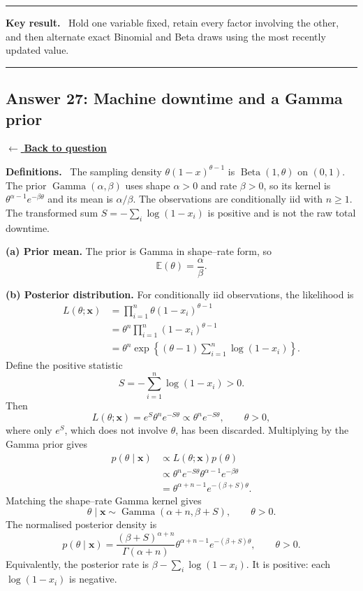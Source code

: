 \documentclass[11pt,a4paper]{article}
\newcommand{\xvec}{\boldsymbol{x}}
\newcommand{\E}{\mathbb{E}}
\newcommand{\answernav}[1]{%
  \label{answer:#1}%
  \noindent\hyperref[question:#1]{$\leftarrow$ \textbf{Back to question}}%
  \par\smallskip}
\newcommand{\studyheading}[1]{%
  \par\medskip\noindent\textcolor{statblue}{\textbf{#1.}}\ }
\newenvironment{keyresult}
  {\begin{center}\begin{minipage}{0.92\linewidth}\color{statblue}%
   \hrule\vspace{6pt}\textbf{Key result.}\ }
  {\vspace{6pt}\hrule\end{minipage}\end{center}}
\begin{document}
\begin{keyresult}
Hold one variable fixed, retain every factor involving the other, and then
alternate exact Binomial and Beta draws using the most recently updated value.
\end{keyresult}

\clearpage

\subsection{Answer 27: Machine downtime and a Gamma prior}
\answernav{27}

\studyheading{Definitions}
The sampling density $\theta(1-x)^{\theta-1}$ is $\operatorname{Beta}(1,\theta)$ on $(0,1)$.
The prior $\operatorname{Gamma}(\alpha,\beta)$ uses shape $\alpha>0$ and rate $\beta>0$, so its kernel is $\theta^{\alpha-1}e^{-\beta\theta}$ and its mean is $\alpha/\beta$.
The observations are conditionally iid with $n\ge1$.
The transformed sum $S=-\sum_i\log(1-x_i)$ is positive and is not the raw total downtime.

\textbf{(a) Prior mean.}
The prior is Gamma in shape--rate form, so
\[
\boxed{\E(\theta)=\frac{\alpha}{\beta}.}
\]

\textbf{(b) Posterior distribution.}
For conditionally iid observations, the likelihood is
\[
\begin{aligned}
L(\theta;\xvec)
&=\prod_{i=1}^{n}\theta(1-x_i)^{\theta-1}\\
&=\theta^n\prod_{i=1}^{n}(1-x_i)^{\theta-1}\\
&=\theta^n\exp\!\left\{(\theta-1)
\sum_{i=1}^{n}\log(1-x_i)\right\}.
\end{aligned}
\]
Define the positive statistic
\[
S=-\sum_{i=1}^{n}\log(1-x_i)>0.
\]
Then
\[
L(\theta;\xvec)
=e^S\theta^ne^{-S\theta}
\propto\theta^ne^{-S\theta},\qquad\theta>0,
\]
where only $e^S$, which does not involve $\theta$, has been discarded.
Multiplying by the Gamma prior gives
\[
\begin{aligned}
p(\theta\mid\xvec)
&\propto L(\theta;\xvec)p(\theta)\\
&\propto\theta^ne^{-S\theta}
\theta^{\alpha-1}e^{-\beta\theta}\\
&=\theta^{\alpha+n-1}e^{-(\beta+S)\theta}.
\end{aligned}
\]
Matching the shape--rate Gamma kernel gives
\[
\boxed{\theta\mid\xvec\sim
\operatorname{Gamma}(\alpha+n,\beta+S),\qquad\theta>0.}
\]
The normalised posterior density is
\[
\boxed{p(\theta\mid\xvec)
=\frac{(\beta+S)^{\alpha+n}}{\Gamma(\alpha+n)}
\theta^{\alpha+n-1}e^{-(\beta+S)\theta},\qquad\theta>0.}
\]
Equivalently, the posterior rate is
$\beta-\sum_i\log(1-x_i)$. It is positive: each $\log(1-x_i)$ is negative.
\end{document}
